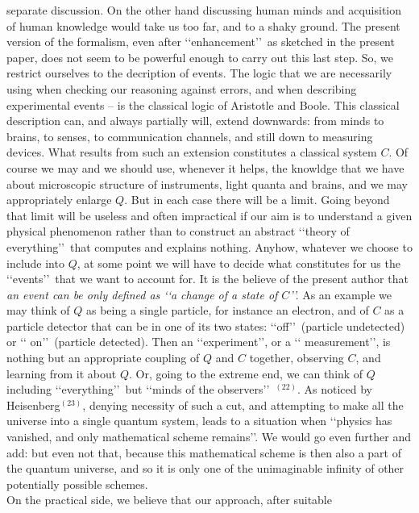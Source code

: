 \documentclass[12pt]{article}
\def\lqq{\lq\lq}
\def\rqq{\rq\rq}
\begin{document}
separate discussion. On the other hand discussing human
minds and acquisition of human knowledge would take us too far, and to
a shaky ground.
The present version of the formalism, even after \lqq enhancement\rqq\,  as
sketched in the present paper, does not seem to be powerful enough to
carry out this last step. So, we restrict ourselves to the
decription of events. The logic that we are necessarily
using
when
checking our reasoning against errors, and when describing experimental
events -- is the classical logic of Aristotle and
Boole. This classical description can, and always partially will, extend
downwards: from minds to brains, to senses, to communication channels,
and still down to measuring devices. What results from such an extension
constitutes a classical system $C$. Of course we may and we should use,
whenever it helps, the knowldge that we have about
microscopic structure of instruments, light quanta and brains, and we
may appropriately enlarge $Q$. But in each case there will be a limit.
Going beyond that limit will be useless and often impractical if our
aim is to understand a given physical phenomenon rather than  to  construct
an abstract \lqq theory of  everything\rqq\,  that computes and explains
nothing.
Anyhow, whatever we choose to include into $Q$, at some point we will
have to decide what constitutes for us the \lqq events\rqq\,  that we want
to account for.  It is the believe of the present author
that {\sl an event can be only defined as \lqq a change of a state of
$C$\rqq.} As an example we may think of $Q$ as being a single particle, for
instance an electron, and of $C$ as a particle detector that can be in
one of its two states: \lqq off\rqq\,  (particle undetected) or \lqq
on\rqq\, (particle detected). Then an \lqq experiment\rqq, or a \lqq
measurement\rqq, is nothing but an
appropriate coupling of $Q$ and $C$ together, observing $C$, and
learning from it about $Q$. Or, going to the extreme end, we can think
of $Q$ including \lqq everything\rqq\,  but \lqq minds of the
observers\rqq\, $^{(22)}$.
As noticed by Heisenberg$^{(23)}$, denying necessity of such a cut, and
attempting to make all the universe into a single quantum system,
leads to a situation when \lqq physics has vanished, and only mathematical
scheme remains\rqq. We would go even further and add:
but even not that, because this mathematical scheme is
then also a part of the quantum universe, and so it is only one of the
unimaginable infinity of other potentially possible schemes. \\
On the practical side, we believe that our approach, after suitable
\end{document}
